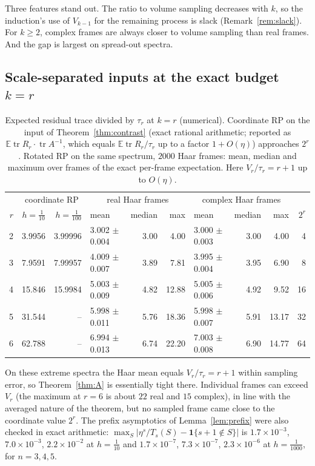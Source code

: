 \documentclass[11pt,a4paper]{article}
\theoremstyle{definition}
\newcommand{\E}{\mathbb{E}}
\newcommand{\tr}{\operatorname{tr}}
\begin{document}
Three features stand out. The ratio to volume sampling decreases with $k$, so the induction's use of $V_{k-1}$ for the remaining process is slack (Remark~\ref{rem:slack}). For $k\ge2$, complex frames are always closer to volume sampling than real frames. And the gap is largest on spread-out spectra.

\subsection{Scale-separated inputs at the exact budget $k=r$}

\begin{table}[h]
\centering\small
\begin{tabular}{@{}r|rr|lrr|lrr|r@{}}
\toprule
& \multicolumn{2}{c|}{coordinate RP} & \multicolumn{3}{c|}{real Haar frames} & \multicolumn{3}{c|}{complex Haar frames} & \\
$r$ & $h=\frac1{10}$ & $h=\frac1{100}$ & mean & median & max & mean & median & max & $2^r$\\
\midrule
2 & 3.9956 & 3.99996 & 3.002 $\pm$ 0.004 & 3.00 & 4.00 & 3.000 $\pm$ 0.003 & 3.00 & 4.00 & 4\\
3 & 7.9591 & 7.99957 & 4.009 $\pm$ 0.007 & 3.89 & 7.81 & 3.995 $\pm$ 0.004 & 3.95 & 6.90 & 8\\
4 & 15.846 & 15.9984 & 5.003 $\pm$ 0.009 & 4.82 & 12.88 & 5.005 $\pm$ 0.006 & 4.92 & 9.52 & 16\\
5 & 31.544 & -- & 5.998 $\pm$ 0.011 & 5.76 & 18.36 & 5.998 $\pm$ 0.007 & 5.91 & 13.17 & 32\\
6 & 62.788 & -- & 6.994 $\pm$ 0.013 & 6.74 & 22.20 & 7.003 $\pm$ 0.008 & 6.90 & 14.77 & 64\\
\bottomrule
\end{tabular}
\caption{Expected residual trace divided by $\tau_r$ at $k=r$ (numerical). Coordinate RP on the input of Theorem~\ref{thm:contrast} (exact rational arithmetic; reported as $\E\tr R_r\cdot\tr A^{-1}$, which equals $\E\tr R_r/\tau_r$ up to a factor $1+O(\eta)$) approaches $2^r$. Rotated RP on the same spectrum, $2000$ Haar frames: mean, median and maximum over frames of the exact per-frame expectation. Here $V_r/\tau_r=r+1$ up to $O(\eta)$.}
\label{tab:det01}
\end{table}

On these extreme spectra the Haar mean equals $V_r/\tau_r=r+1$ within sampling error, so Theorem~\ref{thm:A} is essentially tight there. Individual frames can exceed $V_r$ (the maximum at $r=6$ is about $22$ real and $15$ complex), in line with the averaged nature of the theorem, but no sampled frame came close to the coordinate value $2^r$. The prefix asymptotics of Lemma~\ref{lem:prefix} were also checked in exact arithmetic: $\max_S|\eta^s/T_s(S)-\mathbf 1\{s+1\notin S\}|$ is $1.7\times10^{-3}$, $7.0\times10^{-3}$, $2.2\times10^{-2}$ at $h=\frac1{10}$ and $1.7\times10^{-7}$, $7.3\times10^{-7}$, $2.3\times10^{-6}$ at $h=\frac1{1000}$, for $n=3,4,5$.
\end{document}
